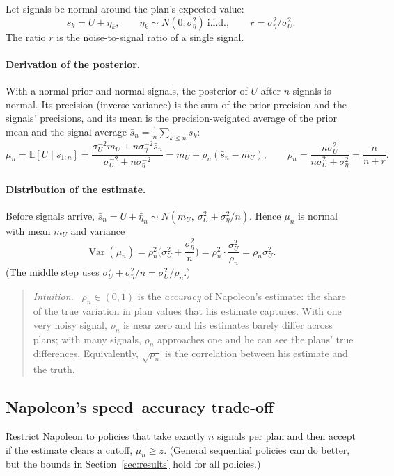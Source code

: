\documentclass[11pt]{article}
\newcommand{\Nap}{\textcolor{nap}{Napoleon}}
\theoremstyle{remark}
\newenvironment{intuition}{\begin{quote}\small\color{muted}\textit{Intuition.}\ }{\end{quote}}
\newcommand{\E}{\mathbb{E}}
\DeclareMathOperator{\Var}{Var}
\begin{document}
Let signals be normal around the plan's expected value:
\[
s_k=U+\eta_k,\qquad\eta_k\sim N(0,\sigma_\eta^2)\ \text{i.i.d.},\qquad r=\sigma_\eta^2/\sigma_U^2.
\]
The ratio $r$ is the noise-to-signal ratio of a single signal.

\paragraph{Derivation of the posterior.} With a normal prior and normal signals, the posterior of $U$ after $n$ signals is normal. Its precision (inverse variance) is the sum of the prior precision and the signals' precisions, and its mean is the precision-weighted average of the prior mean and the signal average $\bar s_n=\frac1n\sum_{k\le n}s_k$:
\[
\mu_n=\E[U\mid s_{1:n}]=\frac{\sigma_U^{-2}m_U+n\sigma_\eta^{-2}\bar s_n}{\sigma_U^{-2}+n\sigma_\eta^{-2}}=m_U+\rho_n(\bar s_n-m_U),\qquad\rho_n=\frac{n\sigma_U^2}{n\sigma_U^2+\sigma_\eta^2}=\frac{n}{n+r}.
\]

\paragraph{Distribution of the estimate.} Before signals arrive, $\bar s_n=U+\bar\eta_n\sim N(m_U,\ \sigma_U^2+\sigma_\eta^2/n)$. Hence $\mu_n$ is normal with mean $m_U$ and variance
\[
\Var(\mu_n)=\rho_n^2\Big(\sigma_U^2+\frac{\sigma_\eta^2}{n}\Big)=\rho_n^2\cdot\frac{\sigma_U^2}{\rho_n}=\rho_n\sigma_U^2.
\]
(The middle step uses $\sigma_U^2+\sigma_\eta^2/n=\sigma_U^2/\rho_n$.)

\begin{intuition}
$\rho_n\in(0,1)$ is the \emph{accuracy} of \Nap's estimate: the share of the true variation in plan values that his estimate captures. With one very noisy signal, $\rho_n$ is near zero and his estimates barely differ across plans; with many signals, $\rho_n$ approaches one and he can see the plans' true differences. Equivalently, $\sqrt{\rho_n}$ is the correlation between his estimate and the truth.
\end{intuition}

\subsection{Napoleon's speed--accuracy trade-off}

Restrict \Nap{} to policies that take exactly $n$ signals per plan and then accept if the estimate clears a cutoff, $\mu_n\ge z$. (General sequential policies can do better, but the bounds in Section~\ref{sec:results} hold for all policies.)
\end{document}
